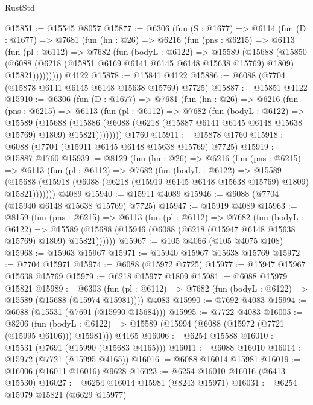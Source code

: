 \begin{lexlean}{RustStd}
\begin{coremodule}
@15851 := @15545 @8057
@15877 := @6306
    (fun (S : @1677) =>
    @6114
      (fun (D : @1677) =>
      @7681
        (fun (hn : @26) =>
        @6216
          (fun (pns : @6215) =>
          @6113
            (fun (pl : @6112) =>
            @7682
              (fun (bodyL : @6122) =>
              @15589
                (@15688
                  (@15850
                    (@6088
                      (@6218 (@15851 @6169 @6141 @6145 @6148 @15638 @15769) @1809)
                      @15821)))))))))
    @4122
@15878 := @15841 @4122
@15886 := @6088 (@7704 (@15878 @6141 @6145 @6148 @15638 @15769) @7725)
@15887 := @15851 @4122
@15910 := @6306
    (fun (D : @1677) =>
    @7681
      (fun (hn : @26) =>
      @6216
        (fun (pns : @6215) =>
        @6113
          (fun (pl : @6112) =>
          @7682
            (fun (bodyL : @6122) =>
            @15589
              (@15688
                (@15886 (@6088 (@6218 (@15887 @6141 @6145 @6148 @15638 @15769) @1809) @15821))))))))
    @1760
@15911 := @15878 @1760
@15918 := @6088 (@7704 (@15911 @6145 @6148 @15638 @15769) @7725)
@15919 := @15887 @1760
@15939 := @8129
    (fun (hn : @26) =>
    @6216
      (fun (pns : @6215) =>
      @6113
        (fun (pl : @6112) =>
        @7682
          (fun (bodyL : @6122) =>
          @15589
            (@15688 (@15918 (@6088 (@6218 (@15919 @6145 @6148 @15638 @15769) @1809) @15821)))))))
    @4089
@15940 := @15911 @4089
@15946 := @6088 (@7704 (@15940 @6148 @15638 @15769) @7725)
@15947 := @15919 @4089
@15963 := @8159
    (fun (pns : @6215) =>
    @6113
      (fun (pl : @6112) =>
      @7682
        (fun (bodyL : @6122) =>
        @15589 (@15688 (@15946 (@6088 (@6218 (@15947 @6148 @15638 @15769) @1809) @15821))))))
@15967 := @105 @4066 (@105 @4075 @108)
@15968 := @15963 @15967
@15971 := @15940 @15967 @15638 @15769
@15972 := @7704 @15971
@15974 := @6088 (@15972 @7725)
@15977 := @15947 @15967 @15638 @15769
@15979 := @6218 @15977 @1809
@15981 := @6088 @15979 @15821
@15989 := @6303
    (fun (pl : @6112) => @7682 (fun (bodyL : @6122) => @15589 (@15688 (@15974 @15981))))
    @4083
@15990 := @7692 @4083
@15994 := @6088 (@15531 (@7691 (@15990 @15684)))
@15995 := @7722 @4083
@16005 := @8206
    (fun (bodyL : @6122) => @15589 (@15994 (@6088 (@15972 (@7721 (@15995 @6106))) @15981)))
    @4165
@16006 := @6254 @15588
@16010 := @15531 (@7691 (@15990 (@15683 @4165)))
@16011 := @6088 @16010
@16014 := @15972 (@7721 (@15995 @4165))
@16016 := @6088 @16014 @15981
@16019 := @16006 (@16011 @16016) @9628
@16023 := @6254 @16010 @16016 (@6413 @15530)
@16027 := @6254 @16014 @15981 (@8243 @15971)
@16031 := @6254 @15979 @15821 (@6629 @15977)

\end{coremodule}
\end{lexlean}
